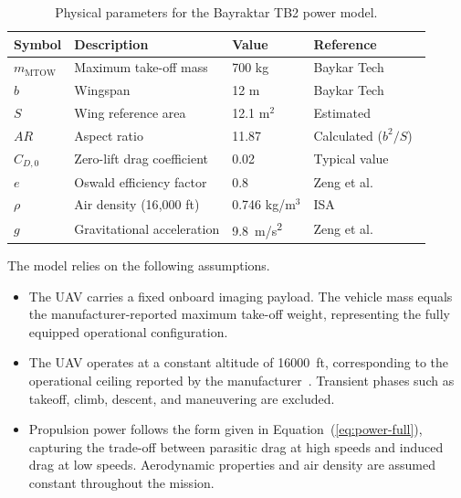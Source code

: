 \documentclass[11pt]{article}
\begin{document}
\begin{table}[!htbp]
\centering
\caption{Physical parameters for the Bayraktar TB2 power model.}
\label{tab:parameters}
\begin{tabular}{@{}llll@{}}
\toprule
\textbf{Symbol} & \textbf{Description} & \textbf{Value} & \textbf{Reference} \\ \midrule
$m_{\text{MTOW}}$ & Maximum take-off mass & 700 kg & Baykar Tech~\cite{baykar_tb2} \\
$b$ & Wingspan & 12 m & Baykar Tech~\cite{baykar_tb2} \\
$S$ & Wing reference area & 12.1 m$^2$ & Estimated~\cite{anderson_aerodynamics}\\
$AR$ & Aspect ratio & 11.87 & Calculated ($b^2/S$)~\cite{anderson_aerodynamics} \\
$C_{D,0}$ & Zero-lift drag coefficient & 0.02 & Typical value~\cite{anderson_aerodynamics} \\
$e$ & Oswald efficiency factor & 0.8 & Zeng et al. \cite{zeng2017energy} \\
$\rho$ & Air density (16{,}000 ft) & 0.746 kg/m$^3$ & ISA~\cite{icao_standard_atmosphere} \\
$g$ & Gravitational acceleration & \SI{9.8}{m/s^2} & Zeng et al. \cite{zeng2017energy} \\ \bottomrule
\end{tabular}
\end{table}

The model relies on the following assumptions.
\begin{itemize}
    \item The UAV carries a fixed onboard imaging payload. The vehicle mass equals the manufacturer-reported maximum take-off weight, representing the fully equipped operational configuration.

    \item The UAV operates at a constant altitude of \SI{16000}{ft}, corresponding to the operational ceiling reported by the manufacturer~\cite{baykar_tb2}. Transient phases such as takeoff, climb, descent, and maneuvering are excluded.

    \item Propulsion power follows the form given in Equation~(\ref{eq:power-full}), capturing the trade-off between parasitic drag at high speeds and induced drag at low speeds. Aerodynamic properties and air density are assumed constant throughout the mission.
\end{itemize}
\end{document}
